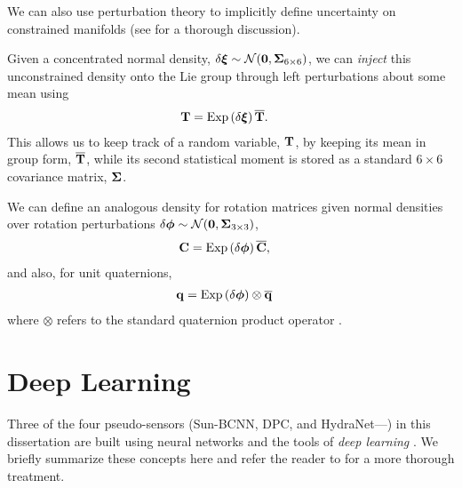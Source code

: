 We can also use perturbation theory to implicitly define uncertainty on constrained manifolds (see \cite{Barfoot2014-ac} for a thorough discussion). 

Given a concentrated normal density, $\delta \boldsymbol{\mathbf{\xi}} \sim \mathcal{N}{}(\boldsymbol{\mathbf{0}}, \boldsymbol{\mathbf{\Sigma}}_{6 \times 6})$, we can \textit{inject} this unconstrained density onto the Lie group through left perturbations about some mean using
\begin{align}
\boldsymbol{\mathbf{T}} &= \mathrm{Exp}\left({\delta \boldsymbol{\mathbf{\xi}}}\right) \overline{\boldsymbol{\mathbf{T}}}. 
\end{align}
This allows us to keep track of a random variable, $\boldsymbol{\mathbf{T}}$, by keeping its mean in group form, $\overline{\boldsymbol{\mathbf{T}}}$, while its second statistical moment is stored as a standard $6 \times 6$ covariance matrix, $\boldsymbol{\mathbf{\Sigma}}$.

We can define an analogous density for rotation matrices given normal densities over rotation perturbations $\delta \boldsymbol{\mathbf{\phi}} \sim \mathcal{N}{}(\boldsymbol{\mathbf{0}}, \boldsymbol{\mathbf{\Sigma}}_{3 \times 3})$,
\begin{align}
\boldsymbol{\mathbf{C}} &= \mathrm{Exp}\left({\delta \boldsymbol{\mathbf{\phi}}}\right) \overline{\boldsymbol{\mathbf{C}}}, 
\end{align}
and also, for unit quaternions,
\begin{align}
\boldsymbol{\mathbf{q}} &= \mathrm{Exp}\left({\delta \boldsymbol{\mathbf{\phi}}}\right) \otimes \overline{\boldsymbol{\mathbf{q}}} 
\end{align}
where $\otimes$ refers to the standard quaternion product operator \cite{Sola2017quaternion}. %


\section{Deep Learning}
Three of the four pseudo-sensors (Sun-BCNN, DPC, and HydraNet---) in this dissertation are built using neural networks and the tools of \textit{deep learning} \citep{LeCun2015-qf}. We briefly summarize these concepts here and refer the reader to \cite{Goodfellow-et-al-2016} for a more thorough treatment.
